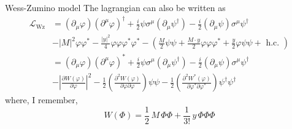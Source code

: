 \documentclass[10pt]{beamer}
\begin{document}
\begin{frame}{Wess-Zumino model}
    The lagrangian can also be written as
    \begin{equation*}
        \begin{aligned}
            \mathcal{L}_{\mathrm{Wz}} &=\left(\partial_{\mu} \varphi\right)\left(\partial^{\mu} \varphi\right)^{\dagger}+\frac{i}{2} \psi \sigma^{\mu}\left(\partial_{\mu} \psi^{\dagger}\right)-\frac{i}{2}\left(\partial_{\mu} \psi\right) \sigma^{\mu} \psi^{\dagger} \\
            &-|M|^{2} \varphi \varphi^*-\frac{|y|^{2}}{4} \varphi \varphi \varphi^* \varphi^*-\left(\frac{M}{2} \psi \psi+\frac{M \cdot y}{2} \varphi \varphi \varphi^*+\frac{y}{2} \varphi \psi \psi+\text { h.c. }\right) \\
            &=\left(\partial_{\mu} \varphi\right)\left(\partial^{\mu} \varphi\right)^{*}+\frac{i}{2} \psi \sigma^{\mu}\left(\partial_{\mu} \psi^{\dagger}\right)-\frac{i}{2}\left(\partial_{\mu} \psi\right) \sigma^{\mu} \psi^{\dagger} \\
            &-\left|\frac{\partial W\left(\varphi\right)}{\partial \varphi}\right|^{2}-\frac{1}{2}\left(\frac{\partial^{2} W\left(\varphi\right)}{\partial \varphi \partial \varphi}\right) \psi \psi-\frac{1}{2}\left(\frac{\partial^{2} W^{*}\left(\varphi\right)}{\partial \varphi^{*} \partial \varphi^{*}}\right) \psi^{\dagger} \psi^{\dagger}
        \end{aligned}
    \end{equation*}
    where, I remember,
    \begin{equation*}
        W(\Phi) = \frac{1}{2} \, M \, \Phi\Phi + \frac{1}{3!} \, y \, \Phi\Phi\Phi
    \end{equation*}
\end{frame}
\end{document}
